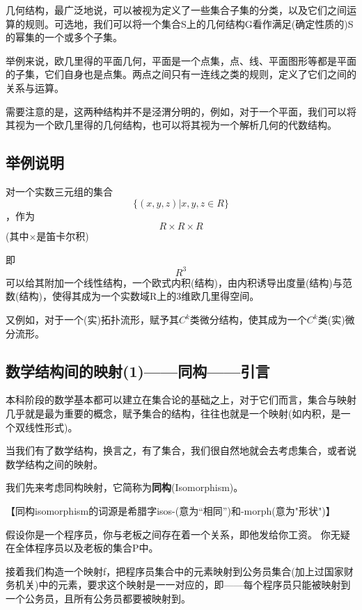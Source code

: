 几何结构，最广泛地说，可以被视为定义了一些集合子集的分类，以及它们之间运算的规则。可选地，我们可以将一个集合S上的几何结构G看作满足(确定性质的)S的幂集的一个或多个子集。 

举例来说，欧几里得的平面几何，平面是一个点集，点、线、平面图形等都是平面的子集，它们自身也是点集。两点之间只有一连线之类的规则，定义了它们之间的关系与运算。

需要注意的是，这两种结构并不是泾渭分明的，例如，对于一个平面，我们可以将其视为一个欧几里得的几何结构，也可以将其视为一个解析几何的代数结构。

\subsection{举例说明}
对一个实数三元组的集合
\begin{equation}
\{(x,y,z)|x,y,z \in R \}
\end{equation}
，作为
\begin{equation}
R \times R \times R
\end{equation}
(其中×是笛卡尔积)

即\begin{equation}
R^3
\end{equation}
可以给其附加一个线性结构，一个欧式内积(结构)，由内积诱导出度量(结构)与范数(结构)，使得其成为一个实数域R上的3维欧几里得空间。 

又例如，对于一个(实)拓扑流形，赋予其$C^k$类微分结构，使其成为一个$C^k$类(实)微分流形。

\subsection{数学结构间的映射(1)——同构——引言}
本科阶段的数学基本都可以建立在集合论的基础之上，对于它们而言，集合与映射几乎就是最为重要的概念，赋予集合的结构，往往也就是一个映射(如内积，是一个双线性形式)。

当我们有了数学结构，换言之，有了集合，我们很自然地就会去考虑集合，或者说数学结构之间的映射。

我们先来考虑同构映射，它简称为\textbf{同构}(Isomorphism)。

【同构isomorphism的词源是希腊字isos-(意为“相同”)和-morph(意为"形状")】

假设你是一个程序员，你与老板之间存在着一个关系，即他发给你工资。
你无疑在全体程序员以及老板的集合P中。

接着我们构造一个映射f，把程序员集合中的元素映射到公务员集合(加上过国家财务机关)中的元素，要求这个映射是一一对应的，即——每个程序员只能被映射到一个公务员，且所有公务员都要被映射到。

